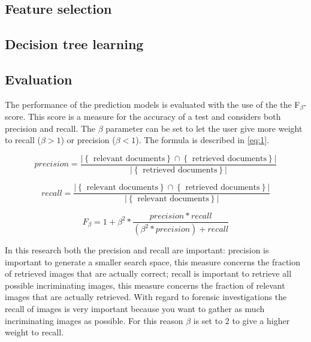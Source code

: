\subsection{Feature selection}

\subsection{Decision tree learning}

\subsection{Evaluation}\label{sec:eval}
The performance of the prediction models is evaluated with the use of the the F$_\beta$-score. This score is a measure for the accuracy of a test and considers both precision and recall. The $\beta$ parameter can be set to let the user give more weight to recall ($\beta > 1 $) or precision ($\beta < 1 $). The formula is described in \autoref{eq:1}.

\begin{equation}\label{eq:1}
precision =  \frac{ \left\vert{\left\{ \text{ relevant documents} \right\} \cap \left\{ \text{ retrieved documents} \right\}}\right\vert }{ \left\vert{\left\{ \text{ retrieved documents} \right\}}\right\vert}
\end{equation}

\begin{equation}\label{eq:1}
recall = \frac{ \left\vert{\left\{ \text{ relevant documents} \right\} \cap \left\{ \text{ retrieved documents} \right\}}\right\vert }{ \left\vert{\left\{ \text{ relevant documents} \right\}}\right\vert}
\end{equation}


\begin{equation}\label{eq:1}
F_\beta = 1 + \beta^{2} * \frac{precision * recall}{(\beta^{2} *precision) + recall}
\end{equation}

In this research both the precision and recall are important: precision is important to generate a smaller search space, this measure concerns the fraction of retrieved images that are actually correct; recall is important to retrieve all possible incriminating images, this measure concerns the fraction of relevant images that are actually retrieved. With regard to forensic investigations the recall of images is very important because you want to gather as much incriminating images as possible. For this reason $\beta$ is set to 2 to give a higher weight to recall. 

